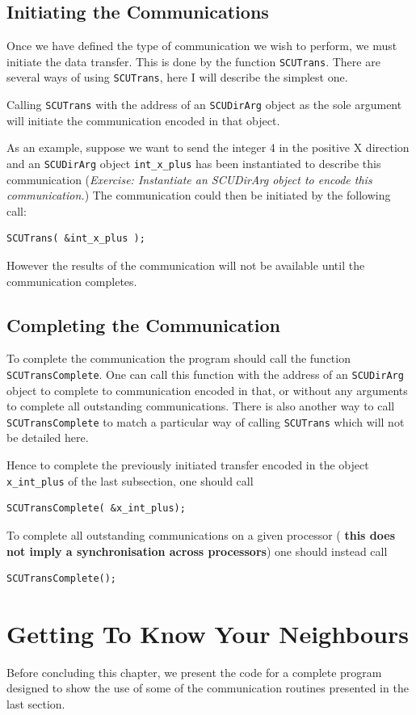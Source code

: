 \subsection{Initiating the Communications}
Once we have defined the type of communication we wish to perform,
we must initiate the data transfer. This is done by the function
{\tt SCUTrans}. There are several ways of using {\tt SCUTrans}, here I will
describe the simplest one.

Calling {\tt SCUTrans} with the address of an {\tt SCUDirArg} object as the 
sole argument will initiate the communication encoded in that object.

As an example, suppose we want to send the integer 4 in the positive X
direction and an {\tt SCUDirArg} object {\tt int\_x\_plus} has been
instantiated to describe this communication ({\em Exercise:
Instantiate an SCUDirArg object to encode this communication.}) The
communication could then be initiated by the following call:
\begin{verbatim}
SCUTrans( &int_x_plus );
\end{verbatim}
However the results of the communication will not be available until the
communication completes.

\subsection{Completing the Communication}
To complete the communication the program should call the function
{\tt SCUTransComplete}. One can call this function with the address
of an {\tt SCUDirArg} object to complete to communication encoded in 
that, or without any arguments to complete all outstanding communications.
There is also another way to call {\tt SCUTransComplete} to match a 
particular way of calling {\tt SCUTrans} which will not be detailed here.

Hence to complete the previously initiated transfer encoded in the object
{\tt x\_int\_plus} of the last subsection, one should call
\begin{verbatim}
SCUTransComplete( &x_int_plus);
\end{verbatim}

To complete all outstanding communications on a given processor ({\bf
this does not imply a synchronisation across processors}) one should
instead call 
\begin{verbatim}
SCUTransComplete();
\end{verbatim}

\section{Getting To Know Your Neighbours}
Before concluding this chapter, we present the code for a complete program
designed to show the use of some of the communication routines presented
in the last section. 

